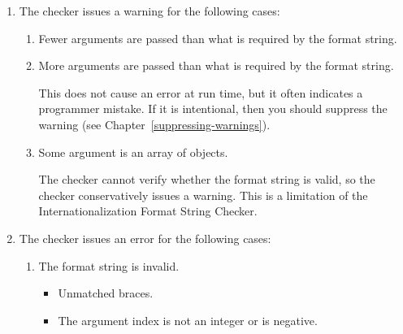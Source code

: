 \begin{enumerate}
  \item The checker issues a warning for the following cases:
    \begin{enumerate}
      \item Fewer arguments are passed than what is required by the format string.


      \item More arguments are passed than what is required by the format string.



      This does not cause an error at run time, but it often indicates a
      programmer mistake.  If it is intentional, then you should suppress
      the warning (see Chapter~\ref{suppressing-warnings}).

      \item Some argument is an array of objects.


      The checker cannot verify whether the format string is valid, so
      the checker conservatively issues a warning.  This is a limitation of
      the Internationalization Format String Checker.

    \end{enumerate}
  \item The checker issues an error for the following cases:
    \begin{enumerate}
      \item The format string is invalid.

        \begin{itemize}
          \item Unmatched braces.


          \item The argument index is not an integer or is negative.




\end{itemize}
\end{enumerate}
\end{enumerate}
